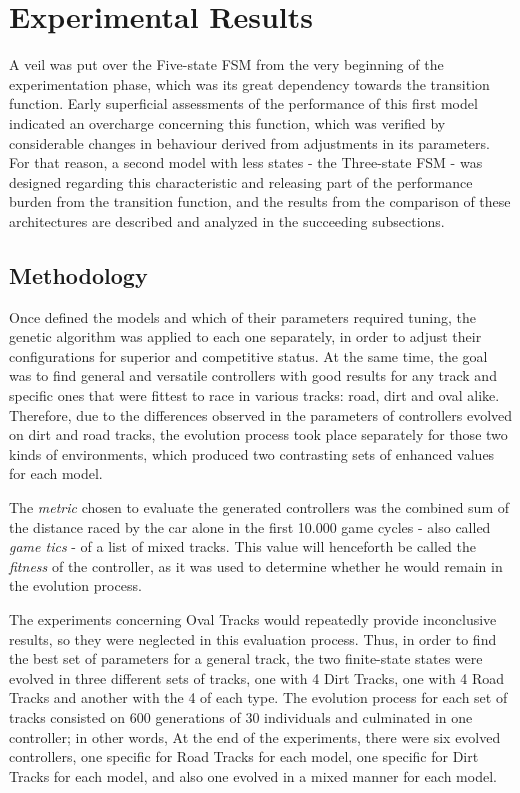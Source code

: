 \section{Experimental Results} \label{sec:Experiments}

	A veil was put over the Five-state FSM from the very beginning of the experimentation phase, which was its great
	dependency towards the transition function. Early superficial assessments of the performance of this first model
	indicated an overcharge concerning this function, which was verified by considerable changes in behaviour derived
	from adjustments in its parameters. For that reason, a second model with less states - the Three-state FSM - was
	designed regarding this characteristic and releasing part of the performance burden from the transition function,
	and the results from the comparison of these architectures are described and analyzed in the succeeding
	subsections.

\subsection{Methodology} \label{subsec:Methodology}

	Once defined the models and which of their parameters required tuning, the genetic algorithm was applied to each
	one separately, in order to adjust their configurations for superior and competitive status. At the same time, the
	goal was to find general and versatile controllers with good results for any track and specific ones that were
	fittest to race in various tracks: road, dirt and oval alike. Therefore, due to the differences observed in the
	parameters of controllers evolved on dirt and road tracks, the evolution process took place separately for those
	two kinds of environments, which produced two contrasting sets of enhanced values for each model.
	
	The \emph{metric} chosen to evaluate the generated controllers was the combined sum of the distance raced by the
	car alone in the first 10.000 game cycles - also called \emph{game tics} - of a list of mixed tracks. This value
	will henceforth be called the \emph{fitness} of the controller, as it was used to determine whether he would
	remain in the evolution process.
	
	The experiments concerning Oval Tracks would repeatedly provide inconclusive results, so they were neglected in
	this evaluation process. Thus, in order to find the best set of parameters for a general track, the two
	finite-state states were evolved in three different sets of tracks, one with 4 Dirt Tracks, one with 4 Road
	Tracks and another with the 4 of each type. The evolution process for each set of tracks consisted on 600
	generations of 30 individuals and culminated in one controller; in other words, At the end of the experiments,
	there were six evolved controllers, one specific for Road Tracks for each model, one specific for Dirt Tracks for
	each model, and also one evolved in a mixed manner for each model.
	
